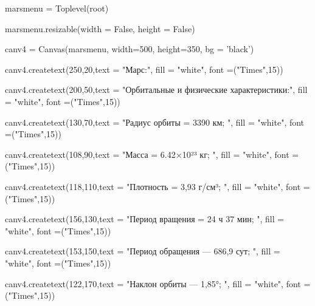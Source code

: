 \documentclass[14pt, oneside]{SavkinSeliverstov}
\begin{document}
	mars\underline{\hspace{0.2cm}}menu = Toplevel(root)
	
	mars\underline{\hspace{0.2cm}}menu.resizable(width = False, height = False)

	canv\underline{\hspace{0.2cm}}4 = Canvas(mars\underline{\hspace{0.2cm}}menu, width=500, height=350, bg = 'black')

	canv\underline{\hspace{0.2cm}}4.create\underline{\hspace{0.2cm}}text(250,20,text = "Марс:", fill = "white", font =("Times",15))
	
	canv\underline{\hspace{0.2cm}}4.create\underline{\hspace{0.2cm}}text(200,50,text = "Орбитальные и физические характеристики:", fill = "white", font =("Times",15))

	canv\underline{\hspace{0.2cm}}4.create\underline{\hspace{0.2cm}}text(130,70,text = "Радиус орбиты = 3390 км; ", fill = "white", font =("Times",15))
	
	canv\underline{\hspace{0.2cm}}4.create\underline{\hspace{0.2cm}}text(108,90,text = "Масса = 6.42×10²³ кг; ", fill = "white", font =("Times",15))

	canv\underline{\hspace{0.2cm}}4.create\underline{\hspace{0.2cm}}text(118,110,text = "Плотность = 3,93 г/см³; ", fill = "white", font =("Times",15))
	
	canv\underline{\hspace{0.2cm}}4.create\underline{\hspace{0.2cm}}text(156,130,text = "Период вращения = 24 ч 37 мин; ", fill = "white", font =("Times",15))
	
	canv\underline{\hspace{0.2cm}}4.create\underline{\hspace{0.2cm}}text(153,150,text = "Период обращения — 686,9 сут; ", fill = "white", font =("Times",15))

	canv\underline{\hspace{0.2cm}}4.create\underline{\hspace{0.2cm}}text(122,170,text = "Наклон орбиты — 1,85°; ", fill = "white", font =("Times",15))
\end{document}

